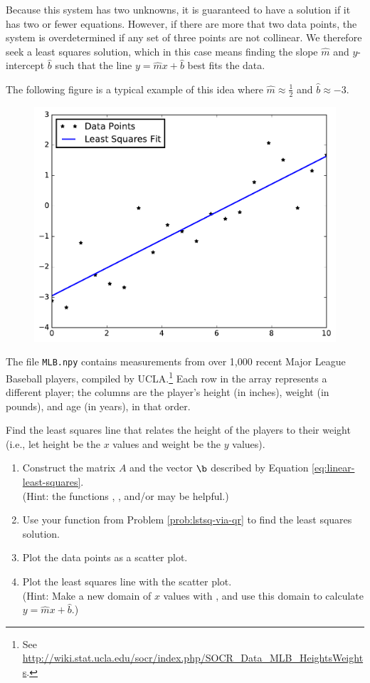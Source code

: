 Because this system has two unknowns, it is guaranteed to have a solution if it has two or fewer equations.
However, if there are more that two data points, the system is overdetermined if any set of three points are not collinear.
We therefore seek a least squares solution, which in this case means finding the slope $\widehat{m}$ and $y$-intercept $\widehat{b}$ such that the line $y = \widehat{m}x+\widehat{b}$ best fits the data.

The following figure is a typical example of this idea where $\widehat{m} \approx \frac{1}{2}$ and $\widehat{b} \approx -3$.

\begin{figure}[H] %
    \includegraphics[width=.5\textwidth]{figures/line_fit_example.pdf}
\end{figure}

\begin{problem} %
The file \texttt{MLB.npy} contains measurements from over 1,000 recent Major League Baseball players, compiled by UCLA.\footnote{See \url{http://wiki.stat.ucla.edu/socr/index.php/SOCR_Data_MLB_HeightsWeights}.}
Each row in the array represents a different player; the columns are the player's height (in inches), weight (in pounds), and age (in years), in that order.

Find the least squares line that relates the height of the players to their weight (i.e., let height be the $x$ values and weight be the $y$ values).
%
\begin{enumerate}
    \item Construct the matrix $A$ and the vector $\b$ described by Equation \ref{eq:linear-least-squares}.\\
    (Hint: the functions , , and/or  may be helpful.)
    \item Use your function from Problem \ref{prob:lstsq-via-qr} to find the least squares solution.
    \item Plot the data points as a scatter plot.
    \item Plot the least squares line with the scatter plot.\\
    (Hint: Make a new domain of $x$ values with , and use this domain to calculate $y = \widehat{m}x + \widehat{b}$.)
\end{enumerate}
\end{problem}

